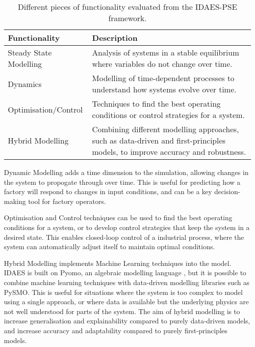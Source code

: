 \documentclass[12pt]{article}
\begin{document}
\begin{table}[h]
    \centering
    \begin{tabular}{|l|p{10cm}|}
        \hline
        \textbf{Functionality} & \textbf{Description} \\
        \hline
        Steady State Modelling & Analysis of systems in a stable equilibrium where variables do not change over time. \\
        \hline
        Dynamics & Modelling of time-dependent processes to understand how systems evolve over time. \\
        \hline
        Optimisation/Control & Techniques to find the best operating conditions or control strategies for a system. \\
        \hline
        Hybrid Modelling & Combining different modelling approaches, such as data-driven and first-principles models, to improve accuracy and robustness. \\
        \hline
    \end{tabular}
    \caption{Different pieces of functionality evaluated from the IDAES-PSE framework.}
    \label{tab:functionality}
\end{table}

Dynamic Modelling adds a time dimension to the simulation, allowing changes in the system to propogate through over time. This is useful for predicting how a factory will respond to changes in input conditions, and can be a key decision-making tool for factory operators.

Optimisation and Control techniques can be used to find the best operating conditions for a system, or to develop control strategies that keep the system in a desired state. This enables closed-loop control of a industrial process, where the system can automatically adjust itself to maintain optimal conditions.

Hybrid Modelling implements Machine Learning techniques into the model. IDAES is built on Pyomo, an algebraic modelling language \cite{bynum2021pyomo}, but it is possible to combine machine learning techniques with data-driven modelling libraries such as PySMO. 
This is useful for situations where the system is too complex to model using a single approach, or where data is available but the underlying physics are not well understood for parts of the system. 
The aim of hybrid modelling is to increase generalisation and explainability compared to purely data-driven models, and increase accuracy and adaptability compared to purely first-principles models.
\end{document}
